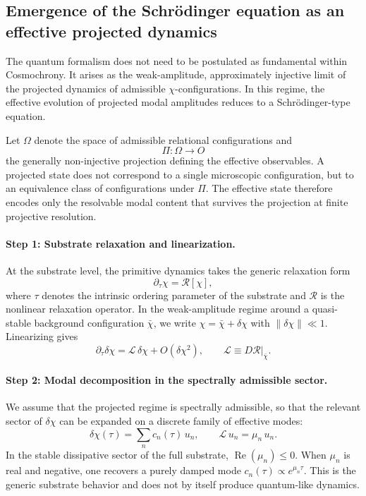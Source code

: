 \subsection{Emergence of the Schr\"{o}dinger equation as an effective projected dynamics}
  \label{app:schrodinger-derivation}

  The quantum formalism does not need to be postulated as fundamental within Cosmochrony.
  It arises as the weak-amplitude, approximately injective limit of the projected dynamics of
  admissible $\chi$-configurations.
  In this regime, the effective evolution of projected modal amplitudes reduces to a
  Schr\"{o}dinger-type equation.

  Let $\Omega$ denote the space of admissible relational configurations and
  \[
    \Pi : \Omega \to O
  \]
  the generally non-injective projection defining the effective observables.
  A projected state does not correspond to a single microscopic configuration, but to an
  equivalence class of configurations under $\Pi$.
  The effective state therefore encodes only the resolvable modal content that survives the
  projection at finite projective resolution.

  \paragraph{Step 1: Substrate relaxation and linearization.}

    At the substrate level, the primitive dynamics takes the generic relaxation form
    \[
      \partial_{\tau}\chi = \mathcal{R}[\chi],
    \]
    where $\tau$ denotes the intrinsic ordering parameter of the substrate and $\mathcal{R}$ is
    the nonlinear relaxation operator.
    In the weak-amplitude regime around a quasi-stable background configuration $\bar{\chi}$,
    we write $\chi = \bar{\chi} + \delta\chi$ with $\|\delta\chi\| \ll 1$.
    Linearizing gives
    \[
      \partial_{\tau}\delta\chi = \mathcal{L}\,\delta\chi + O(\delta\chi^2),
      \qquad
      \mathcal{L} \equiv D\mathcal{R}\big|_{\bar{\chi}}.
    \]

  \paragraph{Step 2: Modal decomposition in the spectrally admissible sector.}

    We assume that the projected regime is spectrally admissible, so that the relevant sector of
    $\delta\chi$ can be expanded on a discrete family of effective modes:
    \[
      \delta\chi(\tau) = \sum_n c_n(\tau)\,u_n,
      \qquad
      \mathcal{L}\,u_n = \mu_n\,u_n.
    \]
    In the stable dissipative sector of the full substrate, $\operatorname{Re}(\mu_n) \leq 0$.
    When $\mu_n$ is real and negative, one recovers a purely damped mode
    $c_n(\tau) \propto e^{\mu_n \tau}$.
    This is the generic substrate behavior and does not by itself produce quantum-like dynamics.

